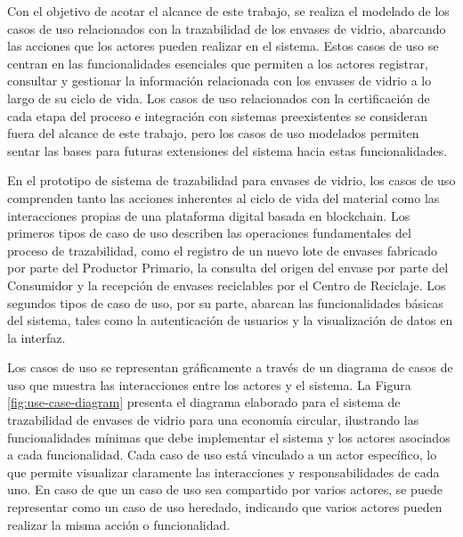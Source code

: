 Con el objetivo de acotar el alcance de este trabajo, se realiza el modelado de los casos de uso relacionados con la trazabilidad de los envases de vidrio, abarcando las acciones que los actores pueden realizar en el sistema. Estos casos de uso se centran en las funcionalidades esenciales que permiten a los actores registrar, consultar y gestionar la información relacionada con los envases de vidrio a lo largo de su ciclo de vida. Los casos de uso relacionados con la certificación de cada etapa del proceso e integración con sistemas preexistentes se consideran fuera del alcance de este trabajo, pero los casos de uso modelados permiten sentar las bases para futuras extensiones del sistema hacia estas funcionalidades.

En el prototipo de sistema de trazabilidad para envases de vidrio, los casos de uso comprenden tanto las acciones inherentes al ciclo de vida del material como las interacciones propias de una plataforma digital basada en blockchain. Los primeros tipos de caso de uso describen las operaciones fundamentales del proceso de trazabilidad, como el registro de un nuevo lote de envases fabricado por parte del Productor Primario, la consulta del origen del envase por parte del Consumidor y la recepción de envases reciclables por el Centro de Reciclaje. Los segundos tipos de caso de uso, por su parte, abarcan las funcionalidades básicas del sistema, tales como la autenticación de usuarios y la visualización de datos en la interfaz.

Los casos de uso se representan gráficamente a través de un diagrama de casos de uso que muestra las interacciones entre los actores y el sistema. La Figura \ref{fig:use-case-diagram} presenta el diagrama elaborado para el sistema de trazabilidad de envases de vidrio para una economía circular, ilustrando las funcionalidades mínimas que debe implementar el sistema y los actores asociados a cada funcionalidad. Cada caso de uso está vinculado a un actor específico, lo que permite visualizar claramente las interacciones y responsabilidades de cada uno. En caso de que un caso de uso sea compartido por varios actores, se puede representar como un caso de uso heredado, indicando que varios actores pueden realizar la misma acción o funcionalidad.

